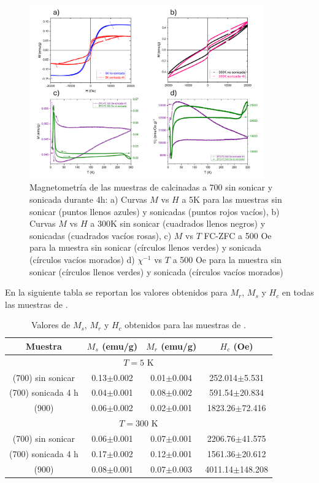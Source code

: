 \documentclass[../main.tex]{subfiles}
\begin{document}
\begin{figure}[H]
    \centering
    \includegraphics[width=0.9\textwidth]{fig/Magnetometria_SmFeO3_sonic.png}
    \caption{Magnetometría de las muestras de \sama{} calcinadas a 700\gradoC{} sin sonicar y sonicada durante 4h: a) Curvas $M$ vs $H$ a 5K para las muestras sin sonicar  (puntos llenos azules) y sonicadas (puntos rojos vacíos), b) Curvas $M$ vs $H$ a 300K sin sonicar  (cuadrados llenos negros) y sonicadas  (cuadrados vacíos rosas),  c) $M$ vs $T$ FC-ZFC a 500 Oe para la muestra sin sonicar (círculos llenos verdes) y sonicada (círculos vacíos morados) d) $\chi^{-1}$ vs $T$ a 500 Oe  para la muestra sin sonicar  (círculos llenos verdes) y sonicada (círculos vacíos morados)}
    \label{fig:M_Sm_sonic}
\end{figure}

En la siguiente tabla se reportan los valores obtenidos para $M_r$, $M_s$ y $H_c$ en todas las muestras de \sama.

\begin{table}[H]
	\centering
	\begin{tabular}{|c||c|c|c|}
		\hline 
		Muestra & $M_s$ (emu/g) & $M_r$ (emu/g) & $H_c$ (Oe) \\
		\hline
		\hline
		\multicolumn{4}{|c|}{$T=5$ K} \\
		\hline 
		\sama{} (700\gradoC{}) sin sonicar & 0.13$\pm$0.002 & 0.01$\pm$0.004 & 252.014$\pm$5.531 \\
		\hline
		\sama{} (700\gradoC{}) sonicada 4 h & 0.04$\pm$0.001 & 0.08$\pm$0.002 & 591.54$\pm$20.834 \\
		\hline
        \sama{} (900\gradoC{}) & 0.06$\pm$0.002 & 0.02$\pm$0.001 & 1823.26$\pm$72.416 \\
		\hline
		\multicolumn{4}{|c|}{$T=300$ K} \\
		\hline
		\sama{} (700\gradoC{}) sin sonicar & 0.06$\pm$0.001 & 0.07$\pm$0.001 & 2206.76$\pm$41.575 \\
		\hline
		\sama{} (700\gradoC{}) sonicada 4 h & 0.17$\pm$0.002 & 0.12$\pm$0.001 & 1561.36$\pm$20.612 \\
		\hline
		\sama{} (900\gradoC{}) & 0.08$\pm$0.001 & 0.07$\pm$0.003 & 4011.14$\pm$148.208 \\
		\hline
	\end{tabular} 
	\caption{Valores de $M_s$, $M_r$ y $H_c$ obtenidos para las muestras de \sama{}.}
	\label{tabla:resmvhsama}
\end{table}
\end{document}
